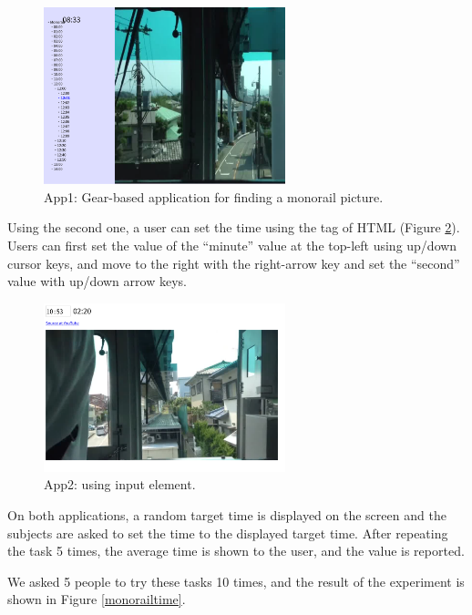 \documentclass[conference]{IEEEtran}
\begin{document}
\begin{figure}[H]
\centerline{
  \includegraphics[width=70mm,bb=0 0 1624 1193]{figures/75007628f75ef1038bd5737e10a728b7.png}
}
\caption{App1: Gear-based application for finding a monorail picture.}
\label{monorailgear}
\end{figure}

Using the second one, a user can set the time using the  tag of HTML (Figure \ref{monorailinput}).
Users can first set the value of the ``minute'' value at the top-left using up/down cursor keys,
and move to the right with the right-arrow key and set the ``second'' value with up/down arrow keys.

\begin{figure}[H]
\centerline{
  \includegraphics[width=70mm,bb=0 0 1596 1116]{figures/325208a6d94c68e4f08e61a67df419c4.png}
}
\caption{App2: using input element.}
\label{monorailinput}
\end{figure}

On both applications, a random target time is displayed on the screen and the subjects are
asked to set the time to the displayed target time.
After repeating the task 5 times, the average time is shown to the user, and the value
is reported.

We asked 5 people to try these tasks 10 times, and the result of the experiment is
shown in Figure \ref{monorailtime}.
\end{document}
